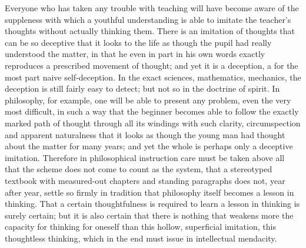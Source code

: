 \documentclass[12pt,a4paper,openany]{book}
\newcommand{\opage}[1]{\marginnote{\footnotesize\textit{[#1]}}}
\begin{document}
Everyone who has taken any trouble with teaching
will have become aware of the suppleness
with which a youthful understanding is able to imitate
the teacher's thoughts without actually thinking them. There is
an imitation of thoughts that can be so deceptive
that it looks to the life as though the pupil had really
understood the matter, in that he even in part in his own
words exactly reproduces a prescribed movement of thought;
and yet it is a deception, a for the most part naive self-deception. In the exact sciences, mathematics, mechanics,
the deception is still fairly easy to detect; but not
so in the doctrine of spirit. In philosophy, for example, one will be able to
present any problem, even the very most difficult,
\setcounter{footnote}{0}%
\opage{317}in such a way that the beginner becomes able to
follow the exactly marked path of thought through all
its windings with such clarity, circumspection and apparent
naturalness that it looks as though
the young man had thought about the matter for many years; and
yet the whole is perhaps only a deceptive imitation.
Therefore in philosophical instruction care must be taken above
all that the scheme does not come to count
as the system, that a stereotyped textbook with measured-out
chapters and standing paragraphs does not, year after year,
settle so firmly in tradition that philosophy itself becomes
a lesson in thinking. That a certain thoughtfulness is required
to learn a lesson in thinking is surely certain; but it is
also certain that there is nothing that weakens more the capacity
for thinking for oneself than this hollow, superficial imitation,
this thoughtless thinking, which in the end must issue in intellectual
mendacity.
\end{document}
